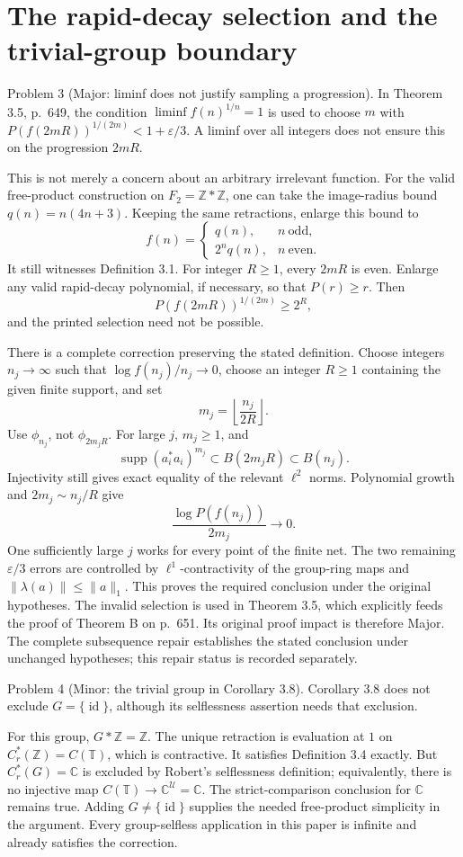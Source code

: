 \documentclass[10pt]{article}
\begin{document}
\section*{The rapid-decay selection and the trivial-group boundary}
Problem 3 (Major: liminf does not justify sampling a progression).  In Theorem 3.5, p. 649, the condition \(\liminf f(n)^{1/n}=1\) is used to choose \(m\) with \(P(f(2mR))^{1/(2m)}<1+\varepsilon/3\). A liminf over all integers does not ensure this on the progression \(2mR\).\par
This is not merely a concern about an arbitrary irrelevant function. For the valid free-product construction on \(F_2=\mathbb Z*\mathbb Z\), one can take the image-radius bound \(q(n)=n(4n+3)\). Keeping the same retractions, enlarge this bound to \[f(n)=
 \begin{cases}
 q(n),&n\ \text{odd},\\
 2^nq(n),&n\ \text{even}.
 \end{cases}\] It still witnesses Definition 3.1. For integer \(R\ge1\), every \(2mR\) is even. Enlarge any valid rapid-decay polynomial, if necessary, so that \(P(r)\ge r\). Then \[P(f(2mR))^{1/(2m)}\ge 2^R ,\] and the printed selection need not be possible.\par
There is a complete correction preserving the stated definition. Choose integers \(n_j\to\infty\) such that \(\log f(n_j)/n_j\to0\), choose an integer \(R\ge1\) containing the given finite support, and set \[m_j=\left\lfloor\frac{n_j}{2R}\right\rfloor .\] Use \(\phi_{n_j}\), not \(\phi_{2m_jR}\). For large \(j\), \(m_j\ge1\), and \[\operatorname{supp}(a_i^*a_i)^{m_j}\subset B(2m_jR)\subset B(n_j).\] Injectivity still gives exact equality of the relevant \(\ell^2\) norms. Polynomial growth and \(2m_j\sim n_j/R\) give \[\frac{\log P(f(n_j))}{2m_j}\longrightarrow0.\] One sufficiently large \(j\) works for every point of the finite net. The two remaining \(\varepsilon/3\) errors are controlled by \(\ell^1\)-contractivity of the group-ring maps and \(\|\lambda(a)\|\le\|a\|_1\). This proves the required conclusion under the original hypotheses. The invalid selection is used in Theorem 3.5, which explicitly feeds the proof of Theorem B on p. 651. Its original proof impact is therefore Major. The complete subsequence repair establishes the stated conclusion under unchanged hypotheses; this repair status is recorded separately.\par
Problem 4 (Minor: the trivial group in Corollary 3.8).  Corollary 3.8 does not exclude \(G=\{\operatorname{id}\}\), although its selflessness assertion needs that exclusion.\par
For this group, \(G*\mathbb Z=\mathbb Z\). The unique retraction is evaluation at \(1\) on \(C_r^*(\mathbb Z)=C(\mathbb T)\), which is contractive. It satisfies Definition 3.4 exactly. But \(C_r^*(G)=\mathbb C\) is excluded by Robert’s selflessness definition; equivalently, there is no injective map \(C(\mathbb T)\to\mathbb C^{\mathcal U}=\mathbb C\). The strict-comparison conclusion for \(\mathbb C\) remains true. Adding \(G\ne\{\operatorname{id}\}\) supplies the needed free-product simplicity in the argument. Every group-selfless application in this paper is infinite and already satisfies the correction.\par
\end{document}
